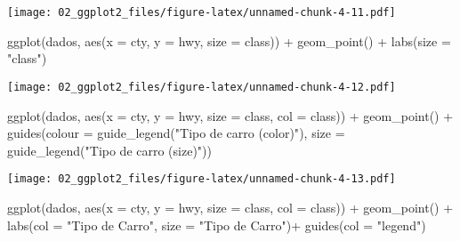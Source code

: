 \documentclass[
]{book}
\newenvironment{Shaded}{\begin{snugshade}}{\end{snugshade}}
\newcommand{\AttributeTok}[1]{\textcolor[rgb]{0.77,0.63,0.00}{#1}}
\newcommand{\FunctionTok}[1]{\textcolor[rgb]{0.00,0.00,0.00}{#1}}
\newcommand{\NormalTok}[1]{#1}
\newcommand{\SpecialCharTok}[1]{\textcolor[rgb]{0.00,0.00,0.00}{#1}}
\newcommand{\StringTok}[1]{\textcolor[rgb]{0.31,0.60,0.02}{#1}}
\begin{document}
\texttt{[image: 02\_ggplot2\_files/figure-latex/unnamed-chunk-4-11.pdf]}

\begin{Shaded}
\begin{Highlighting}[]
\FunctionTok{ggplot}\NormalTok{(dados, }\FunctionTok{aes}\NormalTok{(}\AttributeTok{x =}\NormalTok{ cty, }\AttributeTok{y =}\NormalTok{ hwy, }\AttributeTok{size =}\NormalTok{ class)) }\SpecialCharTok{+} 
  \FunctionTok{geom\_point}\NormalTok{() }\SpecialCharTok{+} 
  \FunctionTok{labs}\NormalTok{(}\AttributeTok{size =} \StringTok{"class"}\NormalTok{)}
\end{Highlighting}
\end{Shaded}

\texttt{[image: 02\_ggplot2\_files/figure-latex/unnamed-chunk-4-12.pdf]}

\begin{Shaded}
\begin{Highlighting}[]
\FunctionTok{ggplot}\NormalTok{(dados, }\FunctionTok{aes}\NormalTok{(}\AttributeTok{x =}\NormalTok{ cty, }\AttributeTok{y =}\NormalTok{ hwy, }
                  \AttributeTok{size =}\NormalTok{ class, }
                  \AttributeTok{col =}\NormalTok{ class)) }\SpecialCharTok{+} 
  \FunctionTok{geom\_point}\NormalTok{() }\SpecialCharTok{+} 
  \FunctionTok{guides}\NormalTok{(}\AttributeTok{colour =} \FunctionTok{guide\_legend}\NormalTok{(}\StringTok{"Tipo de carro (color)"}\NormalTok{),}
         \AttributeTok{size =} \FunctionTok{guide\_legend}\NormalTok{(}\StringTok{"Tipo de carro (size)"}\NormalTok{))}
\end{Highlighting}
\end{Shaded}

\texttt{[image: 02\_ggplot2\_files/figure-latex/unnamed-chunk-4-13.pdf]}

\begin{Shaded}
\begin{Highlighting}[]
\FunctionTok{ggplot}\NormalTok{(dados, }\FunctionTok{aes}\NormalTok{(}\AttributeTok{x =}\NormalTok{ cty, }\AttributeTok{y =}\NormalTok{ hwy, }
                  \AttributeTok{size =}\NormalTok{ class, }
                  \AttributeTok{col =}\NormalTok{ class)) }\SpecialCharTok{+} 
  \FunctionTok{geom\_point}\NormalTok{() }\SpecialCharTok{+} 
  \FunctionTok{labs}\NormalTok{(}\AttributeTok{col =} \StringTok{"Tipo de Carro"}\NormalTok{, }\AttributeTok{size =} \StringTok{"Tipo de Carro"}\NormalTok{)}\SpecialCharTok{+}
  \FunctionTok{guides}\NormalTok{(}\AttributeTok{col =} \StringTok{"legend"}\NormalTok{)}
\end{Highlighting}
\end{Shaded}
\end{document}
